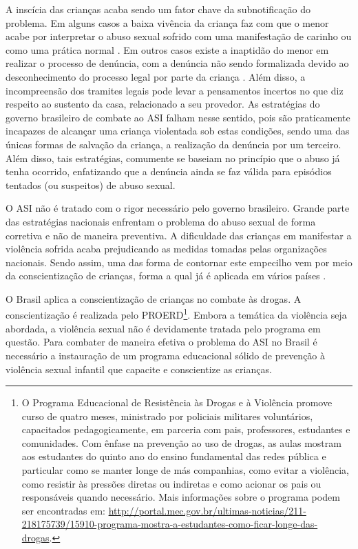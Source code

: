 A inscícia das crianças acaba sendo um fator chave da subnotificação do problema. Em alguns casos a baixa vivência da criança faz com que o menor acabe por interpretar o abuso sexual sofrido com uma manifestação de carinho ou como uma prática normal \cite{aded2006abuso}. Em outros casos existe a inaptidão do menor em realizar o processo de denúncia, com a denúncia não sendo formalizada devido ao desconhecimento do processo legal por parte da criança \cite{OMS2002world}. Além disso, a incompreensão dos tramites legais pode levar a pensamentos incertos no que diz respeito ao sustento da casa, relacionado a seu provedor. As estratégias do governo brasileiro de combate ao \ac{ASI} falham nesse sentido, pois são praticamente incapazes de alcançar uma criança violentada sob estas condições, sendo uma das únicas formas de salvação da criança, a realização da denúncia por um terceiro. Além disso, tais estratégias, comumente se baseiam no princípio que o abuso já tenha ocorrido, enfatizando que a denúncia ainda se faz válida para episódios tentados (ou suspeitos) de abuso sexual.

O \ac{ASI} não é tratado com o rigor necessário pelo governo brasileiro. Grande parte das estratégias nacionais enfrentam o problema do abuso sexual de forma corretiva e não de maneira preventiva. A dificuldade das crianças em manifestar a violência sofrida acaba prejudicando as medidas tomadas pelas organizações nacionais. Sendo assim, uma das forma de contornar este empecilho vem por meio da conscientização de crianças, forma a qual já é aplicada em vários países \cite{plummer1999history, muller2014child}.

O Brasil aplica a conscientização de crianças no combate às drogas. A conscientização é realizada pelo \ac{PROERD}\footnote{O Programa Educacional de Resistência às Drogas e à Violência promove curso de quatro meses, ministrado por policiais militares voluntários, capacitados pedagogicamente, em parceria com pais, professores, estudantes e comunidades. Com ênfase na prevenção ao uso de drogas, as aulas mostram aos estudantes do quinto ano do ensino fundamental das redes pública e particular como se manter longe de más companhias, como evitar a violência, como resistir às pressões diretas ou indiretas e como acionar os pais ou responsáveis quando necessário. Mais informações sobre o programa podem ser encontradas em: \url{http://portal.mec.gov.br/ultimas-noticias/211-218175739/15910-programa-mostra-a-estudantes-como-ficar-longe-das-drogas}.}. Embora a temática da violência seja abordada, a violência sexual não é devidamente tratada pelo programa em questão. Para combater de maneira efetiva o problema do \ac{ASI} no Brasil é necessário a instauração de um programa educacional sólido de prevenção à violência sexual infantil que capacite e conscientize as crianças. 

